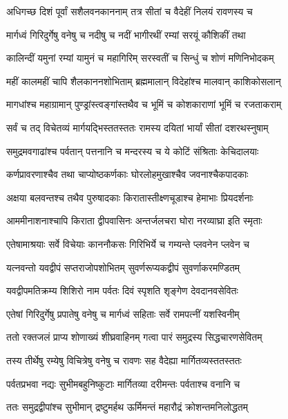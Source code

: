\twolineshloka
{अधिगच्छ दिशं पूर्वां सशैलवनकाननाम्}
{तत्र सीतां च वैदेहीं निलयं रावणस्य च} %

\twolineshloka
{मार्गध्वं गिरिदुर्गेषु वनेषु च नदीषु च}
{नदीं भागीरथीं रम्यां सरयूं कौशिकीं तथा} %

\twolineshloka
{कालिन्दीं यमुनां रम्यां यामुनं च महागिरिम्}
{सरस्वतीं च सिन्धुं च शोणं मणिनिभोदकम्} %

\twolineshloka
{महीं कालमहीं चापि शैलकाननशोभिताम्}
{ब्रह्ममालान् विदेहांश्च मालवान् काशिकोसलान्} %

\twolineshloka
{मागधांश्च महाग्रामान् पुण्ड्रांस्त्वङ्गांस्तथैव च}
{भूमिं च कोशकाराणां भूमिं च रजताकराम्} %

\twolineshloka
{सर्वं च तद् विचेतव्यं मार्गयद्भिस्ततस्ततः}
{रामस्य दयितां भार्यां सीतां दशरथस्नुषाम्} %

\twolineshloka
{समुद्रमवगाढांश्च पर्वतान् पत्तनानि च}
{मन्दरस्य च ये कोटिं संश्रिताः केचिदालयाः} %

\twolineshloka
{कर्णप्रावरणाश्चैव तथा चाप्योष्ठकर्णकाः}
{घोरलोहमुखाश्चैव जवनाश्चैकपादकाः} %

\twolineshloka
{अक्षया बलवन्तश्च तथैव पुरुषादकाः}
{किरातास्तीक्ष्णचूडाश्च हेमाभाः प्रियदर्शनाः} %

\twolineshloka
{आममीनाशनाश्चापि किराता द्वीपवासिनः}
{अन्तर्जलचरा घोरा नरव्याघ्रा इति स्मृताः} %

\twolineshloka
{एतेषामाश्रयाः सर्वे विचेयाः काननौकसः}
{गिरिभिर्ये च गम्यन्ते प्लवनेन प्लवेन च} %

\twolineshloka
{यत्नवन्तो यवद्वीपं सप्तराजोपशोभितम्}
{सुवर्णरूप्यकद्वीपं सुवर्णाकरमण्डितम्} %

\twolineshloka
{यवद्वीपमतिक्रम्य शिशिरो नाम पर्वतः}
{दिवं स्पृशति शृङ्गेण देवदानवसेवितः} %

\twolineshloka
{एतेषां गिरिदुर्गेषु प्रपातेषु वनेषु च}
{मार्गध्वं सहिताः सर्वे रामपत्नीं यशस्विनीम्} %

\twolineshloka
{ततो रक्तजलं प्राप्य शोणाख्यं शीघ्रवाहिनम्}
{गत्वा पारं समुद्रस्य सिद्धचारणसेवितम्} %

\twolineshloka
{तस्य तीर्थेषु रम्येषु विचित्रेषु वनेषु च}
{रावणः सह वैदेह्या मार्गितव्यस्ततस्ततः} %

\twolineshloka
{पर्वतप्रभवा नद्यः सुभीमबहुनिष्कुटाः}
{मार्गितव्या दरीमन्तः पर्वताश्च वनानि च} %

\twolineshloka
{ततः समुद्रद्वीपांश्च सुभीमान् द्रष्टुमर्हथ}
{ऊर्मिमन्तं महारौद्रं क्रोशन्तमनिलोद्धतम्} %

